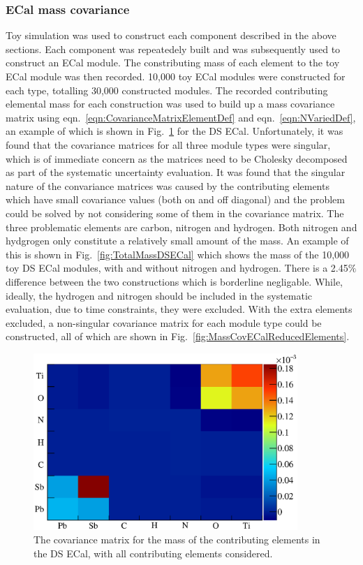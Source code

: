 \subsubsection{ECal mass covariance}
\label{subsubsec:ECalMassCovariance}
Toy simulation was used to construct each component described in the above sections.  Each component was repeatedely built and was subsequently used to construct an ECal module.  The constributing mass of each element to the toy ECal module was then recorded.  10,000 toy ECal modules were constructed for each type, totalling 30,000 constructed modules.  The recorded contributing elemental mass for each construction was used to build up a mass covariance matrix using eqn.~\ref{eqn:CovarianceMatrixElementDef} and eqn.~\ref{eqn:NVariedDef}, an example of which is shown in Fig.~\ref{fig:MassCovDSECalAllElements} for the DS ECal.  Unfortunately, it was found that the covariance matrices for all three module types were singular, which is of immediate concern as the matrices need to be Cholesky decomposed as part of the systematic uncertainty evaluation.  It was found that the singular nature of the convariance matrices was caused by the contributing elements which have small covariance values (both on and off diagonal) and the problem could be solved by not considering some of them in the covariance matrix.  The three problematic elements are carbon, nitrogen and hydrogen.  Both nitrogen and hydgrogen only constitute a relatively small amount of the mass.  An example of this is shown in Fig.~\ref{fig:TotalMassDSECal} which shows the mass of the 10,000 toy DS ECal modules, with and without nitrogen and hydrogen.  There is a 2.45$\%$ difference between the two constructions which is borderline negligable.  While, ideally, the hydrogen and nitrogen should be included in the systematic evaluation, due to time constraints, they were excluded.  With the extra elements excluded, a non-singular covariance matrix for each module type could be constructed, all of which are shown in Fig.~\ref{fig:MassCovECalReducedElements}.
\begin{figure}
  \centering
  \includegraphics[width=10cm]{images/measurement/systematics/detector/mass/MassCov_DSECal_AllElements.eps}
  \caption{The covariance matrix for the mass of the contributing elements in the DS ECal, with all contributing elements considered.}
  \label{fig:MassCovDSECalAllElements}
\end{figure}
